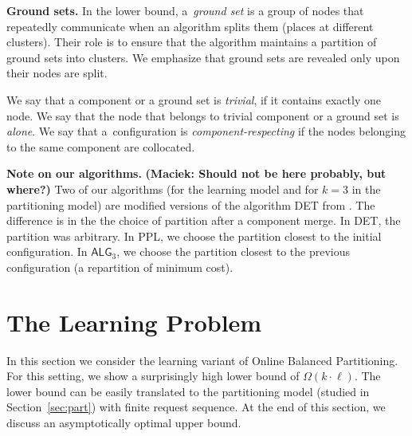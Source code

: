 \documentclass[manuscript,screen=true, review, anonymous]{acmart}
\newcommand{\TAlg}{{\ensuremath{\textsf{ALG}_{3}}}\xspace}
\newcommand\maciek[1]{\color{brown}\textbf{(Maciek: #1)}\color{black}}
\begin{document}
\noindent
\textbf{Ground sets.}
In the lower bound, a~\emph{ground set} is a group of nodes that repeatedly communicate when an algorithm splits them (places at different clusters).
Their role is to ensure that the algorithm maintains a partition of ground sets into clusters.
We emphasize that ground sets are revealed only upon their nodes are split.


We say that a component or a ground set is \emph{trivial}, if it contains exactly one node.
We say that the node that belongs to trivial component or a ground set is \emph{alone}.
We say that a~configuration is \emph{component-respecting}
if the nodes belonging to the same component are collocated.


\noindent
\textbf{Note on our algorithms.}
\maciek{Should not be here probably, but where?}
Two of our algorithms (for the learning model and for $k=3$ in the partitioning model) are modified versions of the algorithm DET from \cite{repartition-disc}.
The difference is in the the choice of partition after a component merge.
In DET, the partition was arbitrary.
In PPL, we choose the partition closest to the initial configuration.
In \TAlg, we choose the partition closest to the previous configuration (a repartition of minimum cost).

\section{The Learning Problem} %

In this section we consider the learning variant of Online Balanced Partitioning.
For this setting, we show a surprisingly high lower bound of $\Omega(k \cdot \ell)$.
The lower bound can be easily translated to the partitioning model (studied in Section~\ref{sec:part}) with finite request sequence.
At the end of this section, we discuss an asymptotically optimal upper bound.
\end{document}
